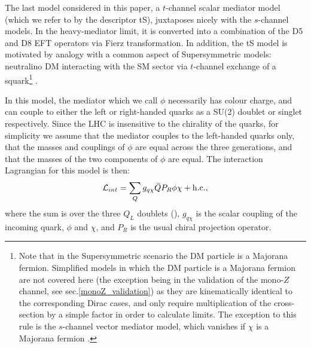 
The last model considered in this paper, a $t$-channel scalar mediator model (which we refer to by the descriptor tS), juxtaposes nicely with the $s$-channel models. In the heavy-mediator limit, it is converted into a combination of the D5 and D8 EFT operators via Fierz transformation. In addition, the tS model is motivated by analogy with a common aspect of Supersymmetric models: neutralino DM interacting with the SM sector via $t$-channel exchange of a squark\footnote{Note that in the Supersymmetric scenario the DM particle is a Majorana fermion. Simplified models in which the DM particle is a Majorana fermion are not covered here (the exception being in the validation of the mono-$Z$ channel, see sec.\ref{monoZ_validation}) as they are kinematically identical to the corresponding Dirac cases, and only require multiplication of the cross-section by a simple factor in order to calculate limits. The exception to this rule is the $s$-channel vector mediator model, which vanishes if $\chi$ is a Majorana fermion \cite{METSig}.} \cite{SUSYDM}.

In this model, the mediator which we call $\phi$ necessarily has colour charge, and can couple to either the left or right-handed quarks as a SU(2) doublet or singlet respectively. Since the LHC is insensitive to the chirality of the quarks, for simplicity we assume that the mediator couples to the left-handed quarks only, that the masses and couplings of $\phi$ are equal across the three generations, and that the masses of the two components of $\phi$ are equal. The interaction Lagrangian for this model is then:
\begin{equation}
\label{L_int_tS}
\mathcal{L}_{int} = \sum_{Q} g_{q \chi} \bar{Q} P_R \phi \chi + {\rm h.c.},
\end{equation}
where the sum is over the three $Q_L$ doublets (), $g_{q \chi}$ is the scalar coupling of the incoming quark, $\phi$ and $\chi$, and $P_R$ is the usual chiral projection operator. 

